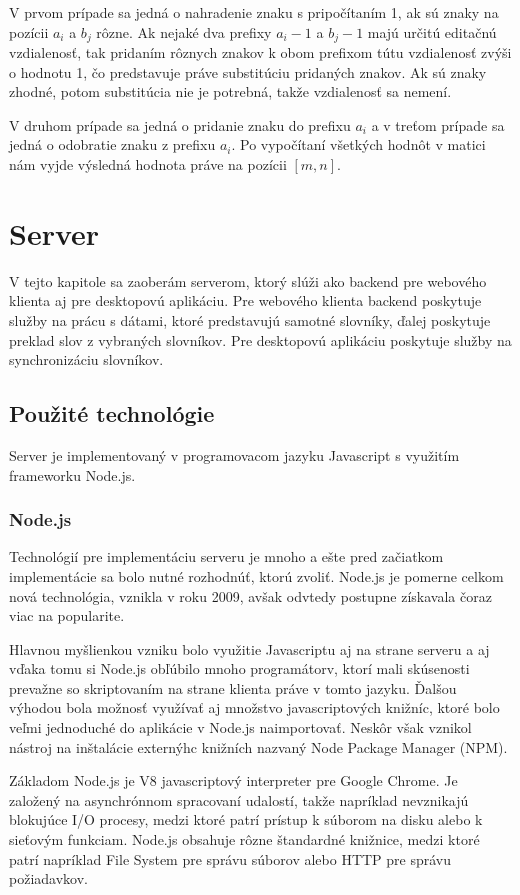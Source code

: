 \documentclass[
  digital, %
  table,   %
  lof,     %
  lot,     %
]{fithesis3}
\begin{document}
V prvom prípade sa jedná o nahradenie znaku s pripočítaním 1, ak sú znaky na pozícii $a_i$ a $b_j$ rôzne. Ak nejaké dva prefixy $a_i-1$ a $b_j-1$ majú určitú editačnú vzdialenosť, tak pridaním rôznych znakov k obom prefixom tútu vzdialenosť zvýši o hodnotu 1, čo predstavuje práve substitúciu pridaných znakov. Ak sú znaky zhodné, potom substitúcia nie je potrebná, takže vzdialenosť sa nemení. 

V druhom prípade sa jedná o pridanie znaku do prefixu $a_i$ a v treťom prípade sa jedná o odobratie znaku z prefixu $a_i$. Po vypočítaní všetkých hodnôt v matici nám vyjde výsledná hodnota práve na pozícii $[m,n]$.



\chapter{Server}
V tejto kapitole sa zaoberám serverom, ktorý slúži ako backend pre webového klienta aj pre desktopovú aplikáciu. Pre webového klienta backend poskytuje služby na prácu s dátami, ktoré predstavujú samotné slovníky, ďalej poskytuje preklad slov z vybraných slovníkov. Pre desktopovú aplikáciu poskytuje služby na synchronizáciu slovníkov.

\section{Použité technológie}
Server je implementovaný v programovacom jazyku Javascript s využitím frameworku Node.js.

\subsection{Node.js}
Technológií pre implementáciu serveru je mnoho a ešte pred začiatkom implementácie sa bolo nutné rozhodnúť, ktorú zvoliť. Node.js je pomerne celkom nová technológia, vznikla v roku 2009, avšak odvtedy postupne získavala čoraz viac na popularite.

Hlavnou myšlienkou vzniku bolo využitie Javascriptu aj na strane serveru a aj vďaka tomu si Node.js obľúbilo mnoho programátorv, ktorí mali skúsenosti prevažne so skriptovaním na strane klienta práve v tomto jazyku. Ďalšou výhodou bola možnosť využívať aj množstvo javascriptových knižníc, ktoré bolo veľmi jednoduché do aplikácie v Node.js naimportovať. Neskôr však vznikol nástroj na inštalácie externýhc knižních nazvaný Node Package Manager (NPM).

Základom Node.js je V8 javascriptový interpreter pre Google Chrome. Je založený na asynchrónnom spracovaní udalostí, takže napríklad nevznikajú blokujúce I/O procesy, medzi ktoré patrí prístup k súborom na disku alebo k sieťovým funkciam. Node.js obsahuje rôzne štandardné knižnice, medzi ktoré patrí napríklad File System pre správu súborov alebo HTTP pre správu požiadavkov.
\end{document}
